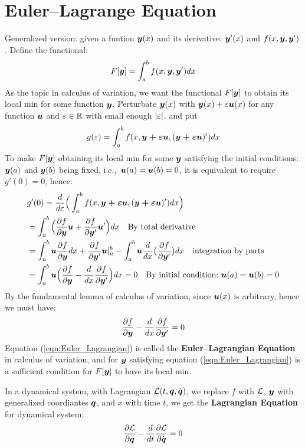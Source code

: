 \documentclass[hidelinks]{article}[12pt]
\begin{document}
\section{Euler--Lagrange Equation}
Generalized version: given a funtion $\boldsymbol{y}(x)$ and its derivative: $\boldsymbol{y}'(x)$ and $f(x, \boldsymbol{y}, \boldsymbol{y}')$. Define the functional:
\begin{equation}
F[\boldsymbol{y}] = \int_a^b f(x, \boldsymbol{y}, \boldsymbol{y}') dx \label{eqn:functional}
\end{equation}
As the topic in calculus of variation, we want the functional $F[\boldsymbol{y}]$ to obtain its local min for some function $\boldsymbol{y}$. Perturbate $\boldsymbol{y}(x)$ with $\boldsymbol{y}(x) + \varepsilon \boldsymbol{u}(x)$ for any function $\boldsymbol{u}$ and $\varepsilon \in \mathbb R$ with small enough $\left|\varepsilon\right|$. and put \[g(\varepsilon) = \int_a^b f(x, \boldsymbol{y + \varepsilon u}, (\boldsymbol{y + \varepsilon u})') dx\]
To make $F[\boldsymbol{y}]$ obtaining its local min for some $\boldsymbol{y}$ satisfying the initial conditions: $\boldsymbol{y}(a)$ and $\boldsymbol{y}(b)$ being fixed, i.e.,\ $\boldsymbol{u}(a) = \boldsymbol{u}(b) = 0$, it is equivalent to require $g'(0) = 0$, hence:
\begin{align*}
& g'(0) = \frac{d}{d\varepsilon}\Big(\int_a^b f(x, \boldsymbol{y + \varepsilon u}, (\boldsymbol{y + \varepsilon u})') dx\Big)\\
& = \int_a^b \Big(\frac{\partial{f}}{\partial{\boldsymbol{y}}}\boldsymbol{u} + \frac{\partial{f}}{\partial{\boldsymbol{y}'}}\boldsymbol{u}' \Big)dx \quad \text{By total derivative}\\
& = \int_a^b \boldsymbol{u} \frac{\partial{f}}{\partial{\boldsymbol{y}}}  dx + \frac{\partial{f}}{\partial{\boldsymbol{y}'}}\boldsymbol{u} \vert_a^b - \int_a^b \boldsymbol{u} \frac{d}{dx}\big(\frac{\partial{f}}{\partial{\boldsymbol{y}'}}\big) dx \quad \text{integration by parts}\\
& = \int_a^b \boldsymbol{u} \Big(\frac{\partial{f}}{\partial{\boldsymbol{y}}} - \frac{d}{dx}\frac{\partial{f}}{\partial{\boldsymbol{y}'}}\Big) dx = 0 \quad \text{By initial condition:} ~ \boldsymbol{u}(a) = \boldsymbol{u}(b) = 0
\end{align*}
By the fundamental lemma of calculus of variation, since $\boldsymbol{u}(x)$ is arbitrary, hence we must have:
\begin{equation}
\frac{\partial{f}}{\partial{\boldsymbol{y}}} - \frac{d}{dx}\frac{\partial{f}}{\partial{\boldsymbol{y}'}} = 0 \label{eqn:Euler_Lagrangian}
\end{equation}
Equation (\ref{eqn:Euler_Lagrangian}) is called the \textbf{Euler--Lagrangian Equation} in calculus of variation, and for $\boldsymbol{y}$ satisfying equation (\ref{eqn:Euler_Lagrangian}) is a sufficient condition for $F[\boldsymbol{y}]$ to have its local min.

In a dynamical system, with Lagrangian ${\cal L}(t, \boldsymbol{q}, \dot{\boldsymbol{q}})$, we replace $f$ with ${\cal L}$, $\boldsymbol{y}$ with generalized coordiantes $\boldsymbol{q}$, and $x$ with time $t$, we get the \textbf{Lagrangian Equation} for dynamical system:
\begin{equation}
\frac{\partial{{\cal L}}}{\partial{\boldsymbol{q}}} - \frac{d}{dt}\frac{\partial{{\cal L}}}{\partial{\dot{\boldsymbol{q}}}} = 0 \label{eqn:Lagrangian} 
\end{equation}
\end{document}

